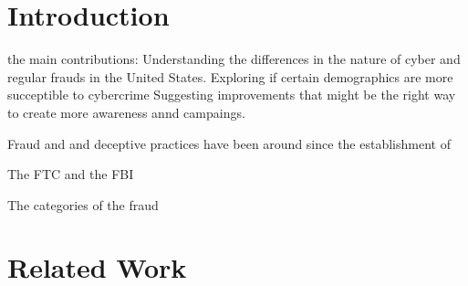 \documentclass[conference]{IEEEtran}
\begin{document}
\begin{abstract}
\lipsum[2-3]
\end{abstract}





%
\IEEEpeerreviewmaketitle


\section{Introduction}
the main contributions:
Understanding the differences in the  nature of cyber and regular frauds in the United States.
Exploring if certain demographics are more succeptible to cybercrime
Suggesting improvements that might be the right way to create more awareness annd campaings.


Fraud and and deceptive practices have been around since the establishment of 


The FTC and the FBI 


The categories of the fraud


\lipsum[2-7]

\section{Related Work}
\end{document}
